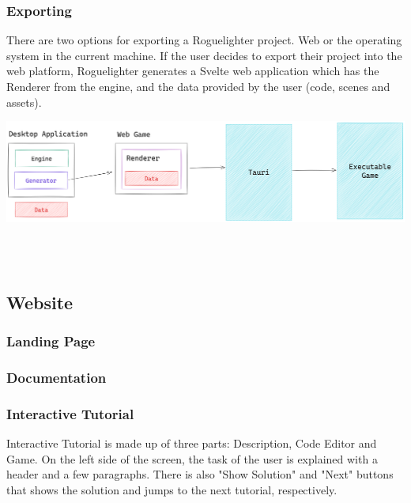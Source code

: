 \documentclass{article}
\begin{document}
\subsubsection{Exporting}
There are two options for exporting a Roguelighter project. Web or the operating system in the current machine. If the user decides to export their project into the web platform, Roguelighter generates a Svelte web application which has the Renderer from the engine, and the data provided by the user (code, scenes and assets).\\

\begin{minipage}{\linewidth}
    \centering
    \includegraphics[width=1\textwidth]{tauri.png}
\end{minipage}\\\\

\subsection{Website}
\subsubsection{Landing Page}
\subsubsection{Documentation}


\subsubsection{Interactive Tutorial}
Interactive Tutorial is made up of three parts: Description, Code Editor and Game. On the left side of the screen, the task of the user is explained with a header and a few paragraphs. There is also "Show Solution" and "Next" buttons that shows the solution and jumps to the next tutorial, respectively.\\
\end{document}
